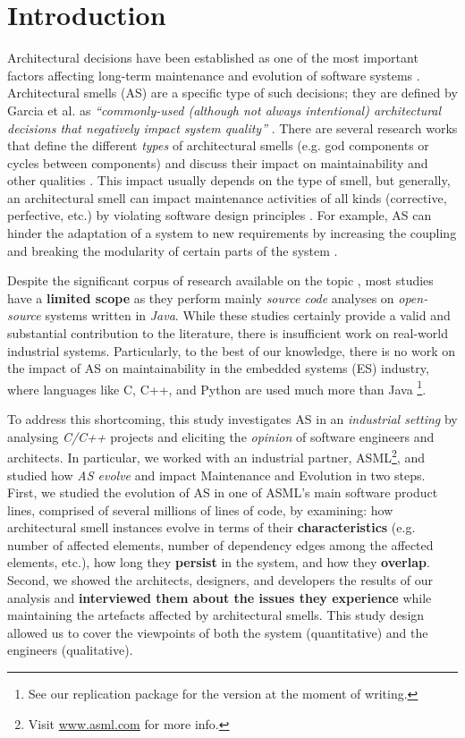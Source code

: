 \section{Introduction}
Architectural decisions have been established as one of the most important factors affecting long-term maintenance and evolution of software systems \cite{Ernst2015}.
Architectural smells (AS) are a specific type of such decisions; they are defined by Garcia et al. as \emph{``commonly-used (although not always intentional) architectural decisions that negatively impact system quality''}  \cite{Garcia2009}.
There are several research works that define the different \emph{types} of architectural smells (e.g. god components or cycles between components) and discuss their impact on maintainability and other qualities \cite{Lippert2006,Arcelli2016,Mo2015,Le2016,Garcia2009}.
This impact usually depends on the type of smell, but generally, an architectural smell can impact maintenance activities of all kinds (corrective, perfective, etc.) by violating software design principles \cite{Azadi2019}.
For example, AS can hinder the adaptation of a system to new requirements by increasing the coupling and breaking the modularity of certain parts of the system \cite{Azadi2019}.

Despite the significant corpus of research available on the topic \cite{Verdecchia2018}, most studies have a \textbf{limited scope} as they perform mainly \emph{source code} analyses on \emph{open-source} systems written in \emph{Java}. 
While these studies certainly provide a valid and substantial contribution to the literature, there is insufficient work on real-world industrial systems. Particularly,  to the best of our knowledge, there is no work on the impact of AS on maintainability in the embedded systems (ES) industry,
where  languages like C, C++, and Python are used much more than Java \cite{Tiobe2021}\footnote{See our replication package for the version at the moment of writing.}.

To address this shortcoming, this study investigates AS in an \emph{industrial setting} by analysing \emph{C/C++} projects and eliciting the \emph{opinion} of software engineers and architects.
In particular, we worked with an industrial partner, ASML\footnote{\label{fn:asml}Visit \url{www.asml.com} for more info.}, and studied how \emph{AS evolve} and impact Maintenance and Evolution \cite{Vliet2008} in two steps.
First, we studied  the evolution of AS in one of ASML's main software product lines, comprised of several millions of lines of code, by examining: how architectural smell instances evolve in terms of their \textbf{characteristics} (e.g. number of affected elements, number of dependency edges among the affected elements, etc.), how long they \textbf{persist} in the system, and how they \textbf{overlap}.
Second, we showed the architects, designers, and developers the results of our analysis and \textbf{interviewed them about the issues they experience} while maintaining the artefacts affected by architectural smells.
This study design allowed us to cover the viewpoints of both the system (quantitative) and the engineers (qualitative). 

